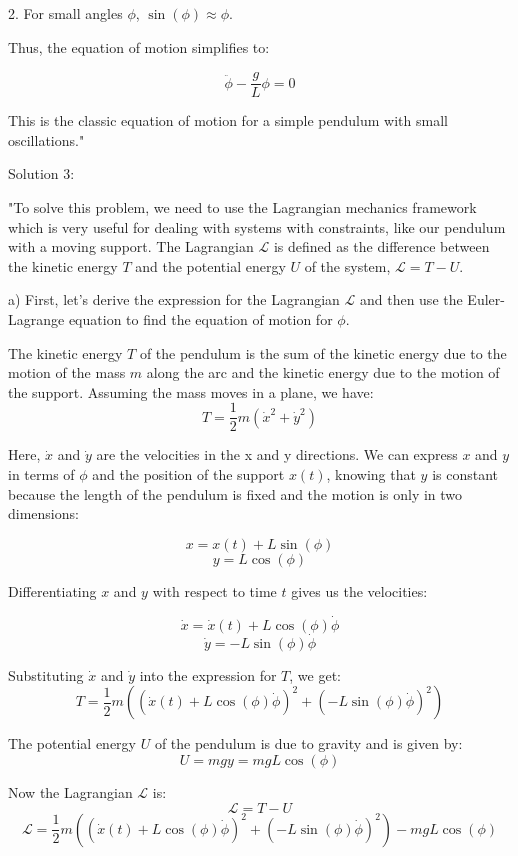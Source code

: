2. For small angles \( \phi \), \( \sin(\phi) \approx \phi \).

Thus, the equation of motion simplifies to:

\[ \ddot{\phi} - \frac{g}{L} \phi = 0 \]

This is the classic equation of motion for a simple pendulum with small oscillations."

Solution 3:

"To solve this problem, we need to use the Lagrangian mechanics framework which is very useful for dealing with systems with constraints, like our pendulum with a moving support. The Lagrangian \( \mathcal{L} \) is defined as the difference between the kinetic energy \( T \) and the potential energy \( U \) of the system, \( \mathcal{L} = T - U \).

a) First, let's derive the expression for the Lagrangian \( \mathcal{L} \) and then use the Euler-Lagrange equation to find the equation of motion for \( \phi \).

The kinetic energy \( T \) of the pendulum is the sum of the kinetic energy due to the motion of the mass \( m \) along the arc and the kinetic energy due to the motion of the support. Assuming the mass moves in a plane, we have:
\[ T = \frac{1}{2} m (\dot{x}^2 + \dot{y}^2) \]

Here, \( \dot{x} \) and \( \dot{y} \) are the velocities in the x and y directions. We can express \( x \) and \( y \) in terms of \( \phi \) and the position of the support \( x(t) \), knowing that \( y \) is constant because the length of the pendulum is fixed and the motion is only in two dimensions:

\[ x = x(t) + L \sin(\phi) \]
\[ y = L \cos(\phi) \]

Differentiating \( x \) and \( y \) with respect to time \( t \) gives us the velocities:

\[ \dot{x} = \dot{x}(t) + L \cos(\phi) \dot{\phi} \]
\[ \dot{y} = -L \sin(\phi) \dot{\phi} \]

Substituting \( \dot{x} \) and \( \dot{y} \) into the expression for \( T \), we get:
\[ T = \frac{1}{2} m \left( (\dot{x}(t) + L \cos(\phi) \dot{\phi})^2 + (-L \sin(\phi) \dot{\phi})^2 \right) \]

The potential energy \( U \) of the pendulum is due to gravity and is given by:
\[ U = mgy = mgL \cos(\phi) \]

Now the Lagrangian \( \mathcal{L} \) is:
\[ \mathcal{L} = T - U \]
\[ \mathcal{L} = \frac{1}{2} m \left( (\dot{x}(t) + L \cos(\phi) \dot{\phi})^2 + (-L \sin(\phi) \dot{\phi})^2 \right) - mgL \cos(\phi) \]

